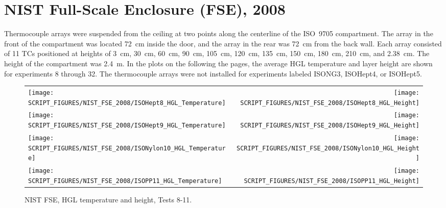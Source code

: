 \section{NIST Full-Scale Enclosure (FSE), 2008}

Thermocouple arrays were suspended from the ceiling at two points along the centerline of the ISO~9705 compartment. The array in the front of the compartment was located 72~cm inside the door, and the array in the rear was 72~cm from the back wall. Each array consisted of 11 TCs positioned at heights of 3~cm, 30~cm, 60~cm, 90~cm, 105~cm, 120~cm, 135~cm, 150~cm, 180~cm, 210~cm, and 2.38~cm. The height of the compartment was 2.4~m. In the plots on the following the pages, the average HGL temperature and layer height are shown for experiments 8 through 32. The thermocouple arrays were not installed for experiments labeled ISONG3, ISOHept4, or ISOHept5.

\newpage

\begin{figure}[p]
\begin{tabular*}{\textwidth}{l@{\extracolsep{\fill}}r}
\texttt{[image: SCRIPT\_FIGURES/NIST\_FSE\_2008/ISOHept8\_HGL\_Temperature]} &
\texttt{[image: SCRIPT\_FIGURES/NIST\_FSE\_2008/ISOHept8\_HGL\_Height]} \\
\texttt{[image: SCRIPT\_FIGURES/NIST\_FSE\_2008/ISOHept9\_HGL\_Temperature]} &
\texttt{[image: SCRIPT\_FIGURES/NIST\_FSE\_2008/ISOHept9\_HGL\_Height]} \\
\texttt{[image: SCRIPT\_FIGURES/NIST\_FSE\_2008/ISONylon10\_HGL\_Temperature]} &
\texttt{[image: SCRIPT\_FIGURES/NIST\_FSE\_2008/ISONylon10\_HGL\_Height]} \\
\texttt{[image: SCRIPT\_FIGURES/NIST\_FSE\_2008/ISOPP11\_HGL\_Temperature]} &
\texttt{[image: SCRIPT\_FIGURES/NIST\_FSE\_2008/ISOPP11\_HGL\_Height]}
\end{tabular*}
\caption[NIST FSE, HGL temperature and height, Tests 8-11]
{NIST FSE, HGL temperature and height, Tests 8-11.}
\label{NIST_FSE_2008_HGL_Temp_1}
\end{figure}

